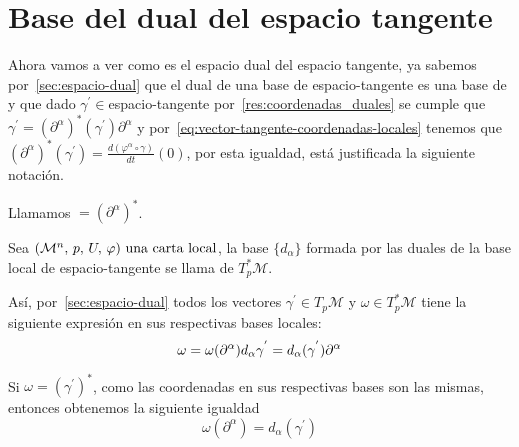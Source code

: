 \section{Base del dual del espacio tangente}\label{sec:base-dual-espacio-tangente}

Ahora vamos a ver como es el espacio dual del espacio tangente, ya sabemos por~\ref{sec:espacio-dual} que el dual de
una base de \gls{espacio-tangente} es una base de  y que dado $\gamma^{'}\in$\gls{espacio-tangente} por~\ref{res:coordenadas_duales} se cumple que $\gamma^{'} = (\partial^\alpha)^*(\gamma^{'})
\partial^\alpha$ y por~\ref{eq:vector-tangente-coordenadas-locales} tenemos que $(\partial^\alpha)^*(\gamma^{'})=\frac{d
(\varphi^\alpha\circ\gamma)}{dt}(0)$, por esta igualdad, está justificada la siguiente notación.

\begin{notation}
  Llamamos $= (\partial^\alpha)^*$.
\end{notation}

\begin{definition}
  Sea $(\mathcal{M}^n,\thinspace p,\thinspace U,\thinspace \varphi)\textmd{ una carta local}$, la base $\{d_\alpha\}$ formada por las duales de la base local de \gls{espacio-tangente} se llama
   de $T^*_p\mathcal{M}$.
\end{definition}

Así, por~\ref{sec:espacio-dual} todos los vectores $\gamma^{'}\in T_p\mathcal{M}$ y $\omega\in T_p^*\mathcal{M}$ tiene
la siguiente expresión en sus respectivas bases locales:
\begin{equation}
  \label{eq:vectores-tangentes-duales-coordenadas-locales}
  \omega = \omega(\partial^\alpha)d_{\alpha}\\
  \gamma^{'}=d_{\alpha}(\gamma^{'})\partial^{\alpha}
\end{equation}

Si $\omega=(\gamma^{'})^*$, como las coordenadas en sus respectivas bases son las mismas, entonces obtenemos la
siguiente igualdad
\begin{equation}
  \label{eq:vector-tangente-coordenadas-locales-iguales}
  \omega(\partial^\alpha)=d_{\alpha}(\gamma^{'})
\end{equation}


